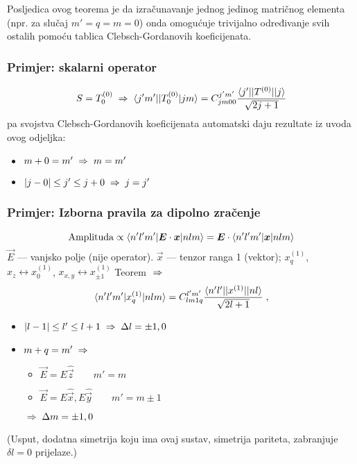 Posljedica ovog teorema je da izračunavanje jednog jedinog matričnog elementa
(npr. za slučaj $m'=q=m=0$) onda omogućuje trivijalno određivanje svih ostalih
pomoću tablica Clebsch-Gordanovih koeficijenata.

\subsubsection{Primjer: skalarni operator}
\begin{displaymath}
S=T^{(0)}_0 \;\Rightarrow\; \langle j'm' ||T^{(0)}_0| jm \rangle = C^{j'm'}_{jm00}
\frac{\langle j' ||T^{(0)}|| j \rangle}{\sqrt{2j+1}}
\end{displaymath}
pa svojstva Clebsch-Gordanovih koeficijenata automatski daju rezultate
iz uvoda ovog odjeljka:
\begin{itemize}
\item $m+0 = m' \;\Rightarrow\; m=m'$
\item $|j-0|\leq j' \leq j+0 \;\Rightarrow\; j=j'$
\end{itemize}

\subsubsection{Primjer: Izborna pravila za dipolno zračenje}

\begin{displaymath}
\text{Amplituda}\propto\bra{n'l'm'}\vec{E}\cdot\vec{x}\ket{nlm} =
\vec{E}\cdot\bra{n'l'm'}\vec{x}\ket{nlm}
\end{displaymath}
$\vec{E}$ --- vanjsko polje (nije operator). $\vec{x}$ --- tenzor ranga
1 (vektor); $x^{(1)}_q$, $x_z \leftrightarrow 
x^{(1)}_0$, $x_{x,y}\leftrightarrow x^{(1)}_{\pm 1}$
Teorem $\;\Rightarrow\;$
\begin{displaymath}
 \langle n'l'm' |x^{(1)}_q | nlm \rangle = C^{l'm'}_{lm1q}
\frac{\langle n'l' ||x^{(1)}|| nl \rangle}{\sqrt{2l+1}} \;,
\end{displaymath}
\begin{itemize}
\item $|l-1|\leq l' \leq l+1 \;\Rightarrow\; \Delta l = \pm 1,0$
\item $m+q = m' \;\Rightarrow\;$
  \begin{itemize}
  \item {} $\vec{E} = E\hat{\vec{z}} \qquad m'=m$
  \item {} $\vec{E} = E\hat{\vec{x}},E\hat{\vec{y}} \qquad m'=m\pm 1$
   \end{itemize}
$\;\Rightarrow\; \Delta m = \pm 1, 0$
\end{itemize}
(Usput, dodatna simetrija koju ima ovaj sustav, simetrija pariteta, zabranjuje
$\delta l = 0$ prijelaze.)


